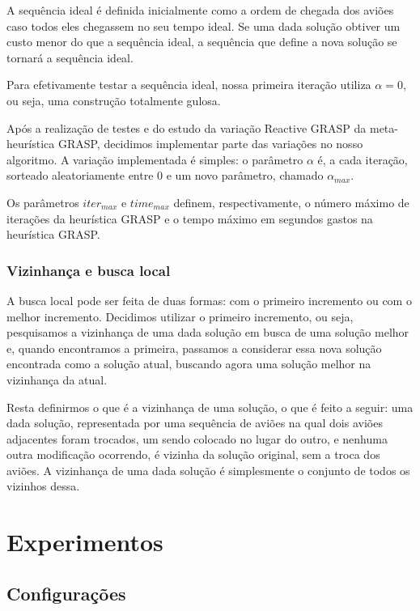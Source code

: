 \documentclass[a4paper,10pt]{abnt} %
\begin{document}
A sequência ideal é definida inicialmente como a ordem de chegada dos aviões caso todos eles chegassem no seu tempo ideal. Se uma dada solução obtiver um custo menor do que a sequência ideal, a sequência que define a nova solução se tornará a sequência ideal.

Para efetivamente testar a sequência ideal, nossa primeira iteração utiliza $\alpha = 0$, ou seja, uma construção totalmente gulosa.

Após a realização de testes e do estudo da variação Reactive GRASP da meta-heurística GRASP, decidimos implementar parte das variações no nosso algoritmo. A variação implementada é simples: o parâmetro $\alpha$ é, a cada iteração, sorteado aleatoriamente entre 0 e um novo parâmetro, chamado $\alpha_{max}$.

Os parâmetros $iter_{max}$ e $time_{max}$ definem, respectivamente, o número máximo de iterações da heurística GRASP e o tempo máximo em segundos gastos na heurística GRASP.

\subsection{Vizinhança e busca local}

A busca local pode ser feita de duas formas: com o primeiro incremento ou com o melhor incremento. Decidimos utilizar o primeiro incremento, ou seja, pesquisamos a vizinhança de uma dada solução em busca de uma solução melhor e, quando encontramos a primeira, passamos a considerar essa nova solução encontrada como a solução atual, buscando agora uma solução melhor na vizinhança da atual.

Resta definirmos o que é a vizinhança de uma solução, o que é feito a seguir: uma dada solução, representada por uma sequência de aviões na qual dois aviões adjacentes foram trocados, um sendo colocado no lugar do outro, e nenhuma outra modificação ocorrendo, é vizinha da solução original, sem a troca dos aviões. A vizinhança de uma dada solução é simplesmente o conjunto de todos os vizinhos dessa.

\chapter{Experimentos}

\section{Configurações}
\end{document}
